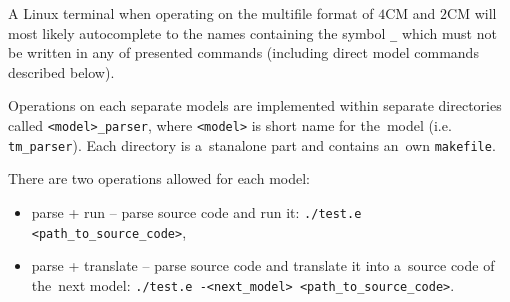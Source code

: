 \documentclass[english,shortabstract,mgr]{iithesis}
\begin{document}
A Linux terminal when operating on the multifile format of $4$CM and $2$CM will
most likely autocomplete to the names containing the symbol \texttt{\_} which must not
be written in any of presented commands (including direct model commands described below).

Operations on each separate models are implemented within separate directories called
\texttt{<model>\_parser}, where \texttt{<model>} is short name for the~model
(i.e. \texttt{tm\_parser}). Each directory is a~stanalone part and contains
an~own \texttt{makefile}.

There are two operations allowed for each model:
\begin{itemize}
  \item parse + run -- parse source code and run it: \texttt{./test.e <path\_to\_source\_code>},
  \item parse + translate -- parse source code and translate it into a~source code
      of the~next model: \texttt{./test.e -<next\_model> <path\_to\_source\_code>}.
\end{itemize}
\end{document}
